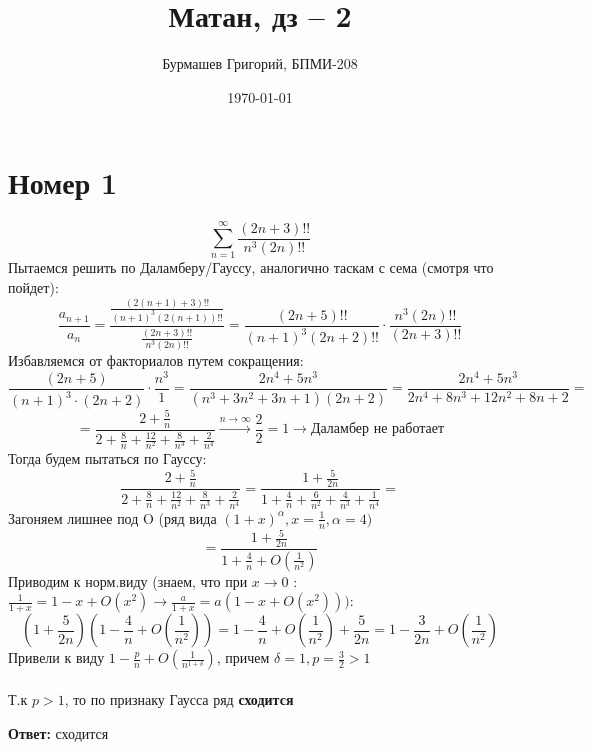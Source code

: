 \documentclass[a4paper,12pt]{article}
\author{Бурмашев Григорий, БПМИ-208}
\title{Матан, дз -- 2}
\date{\today}
\begin{document}
\maketitle
\clearpage
\section*{Номер 1}
\[
\sum_{n =1 }^{\infty} \frac{(2n+3)!!}{n^3(2n)!!}
\]
Пытаемся решить по Даламберу/Гауссу, аналогично таскам с сема (смотря что пойдет):
\[
\frac{a_{n+1}}{a_n} =\frac{ \frac{(2(n+1) + 3)!!}{(n+1)^3 (2(n+1))!!}}{\frac{(2n+3)!!}{n^3(2n)!!}}= \frac{(2n + 5)!!}{(n+1)^3(2n + 2)!!} \cdot \frac{n^3(2n)!!}{(2n+3)!!}
\]
Избавляемся от факториалов путем сокращения:
\[
\frac{(2n+5)}{(n+1)^3 \cdot (2n + 2)} \cdot \frac{n^3}{1} = \frac{2n^4 + 5n^3}{(n^3 + 3n^2 + 3n + 1)(2n+2)} = \frac{2n^4 + 5n^3}{2 n^4 +8n^3 + 12n^2 + 8n + 2 } =
\]
\[
= \frac{2 + \frac{5}{n}}{2 + \frac{8}{n} + \frac{12}{n^2} + \frac{8}{n^3} + \frac{2}{n^4}} \overset{n \rightarrow \infty}{\rightarrow} \frac{2}{2} = 1 \rightarrow \text{Даламбер не работает}
\]
Тогда будем пытаться по Гауссу:
\[
\frac{2 + \frac{5}{n}}{2 + \frac{8}{n} + \frac{12}{n^2} + \frac{8}{n^3} + \frac{2}{n^4}} = \frac{1 + \frac{5}{2n}}{1 + \frac{4}{n} + \frac{6}{n^2} + \frac{4}{n^3} + \frac{1}{n^4}} = 
\]
Загоняем лишнее под O (ряд вида $(1 + x)^{\alpha}, x = \frac{1}{n}, \alpha = 4)$
\[
 = \frac{1 + \frac5{2n}}{1 + \frac4n + O(\frac{1}{n^2})}
\]
Приводим к норм.виду (знаем, что при $x \rightarrow 0$ : $\frac{1}{1+x} = 1 - x + O(x^2) \rightarrow \frac{a}{1 + x} = a(1 - x + O(x^2)))$:
\[
\left(1 + \frac5{2n}\right)\left(1 - \frac{4}{n} + O\left(\frac{1}{n^2}\right) \right) = 1 - \frac{4}{n} + O\left(\frac{1}{n^2}\right)  + \frac{5}{2n} = 1 - \frac{3}{2n} + O\left(\frac{1}{n^2}\right)
\]
Привели к виду $1 - \frac{p}{n} + O\left(\frac{1}{n^{1 + \delta}}\right)$, причем $\delta = 1, p = \frac{3}{2} > 1$
\\\\
Т.к $p > 1$, то по признаку Гаусса ряд \textbf{сходится}
\begin{center}
\textbf{Ответ: } сходится
\end{center}
\clearpage
\end{document}

